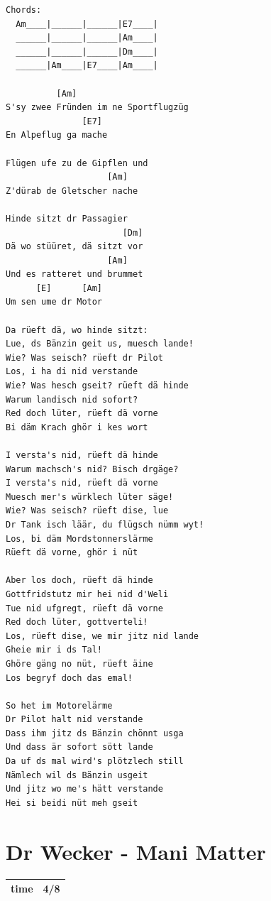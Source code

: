 \documentclass[
]{book}
\let\stdsection\section
\renewcommand\section{\clearpage\stdsection}
\begin{document}
\begin{verbatim}
Chords:
  Am____|______|______|E7____|
  ______|______|______|Am____|
  ______|______|______|Dm____|
  ______|Am____|E7____|Am____|

          [Am]
S'sy zwee Fründen im ne Sportflugzüg
               [E7]
En Alpeflug ga mache

Flügen ufe zu de Gipflen und
                    [Am]
Z'dürab de Gletscher nache

Hinde sitzt dr Passagier
                       [Dm]
Dä wo stüüret, dä sitzt vor
                    [Am]
Und es ratteret und brummet
      [E]      [Am]
Um sen ume dr Motor

Da rüeft dä, wo hinde sitzt:
Lue, ds Bänzin geit us, muesch lande!
Wie? Was seisch? rüeft dr Pilot
Los, i ha di nid verstande
Wie? Was hesch gseit? rüeft dä hinde
Warum landisch nid sofort?
Red doch lüter, rüeft dä vorne
Bi däm Krach ghör i kes wort

I versta's nid, rüeft dä hinde
Warum machsch's nid? Bisch drgäge?
I versta's nid, rüeft dä vorne
Muesch mer's würklech lüter säge!
Wie? Was seisch? rüeft dise, lue
Dr Tank isch läär, du flügsch nümm wyt!
Los, bi däm Mordstonnerslärme
Rüeft dä vorne, ghör i nüt

Aber los doch, rüeft dä hinde
Gottfridstutz mir hei nid d'Weli
Tue nid ufgregt, rüeft dä vorne
Red doch lüter, gottverteli!
Los, rüeft dise, we mir jitz nid lande
Gheie mir i ds Tal!
Ghöre gäng no nüt, rüeft äine
Los begryf doch das emal!

So het im Motorelärme
Dr Pilot halt nid verstande
Dass ihm jitz ds Bänzin chönnt usga
Und dass är sofort sött lande
Da uf ds mal wird's plötzlech still
Nämlech wil ds Bänzin usgeit
Und jitz wo me's hätt verstande
Hei si beidi nüt meh gseit 

\end{verbatim}

\hypertarget{mundart-und-deutsch-dr-wecker}{%
\section{Dr Wecker - Mani Matter}\label{mundart-und-deutsch-dr-wecker}}

\begin{longtable}[]{@{}ll@{}}
\toprule
\endhead
time & 4/8\tabularnewline
\bottomrule
\end{longtable}
\end{document}

